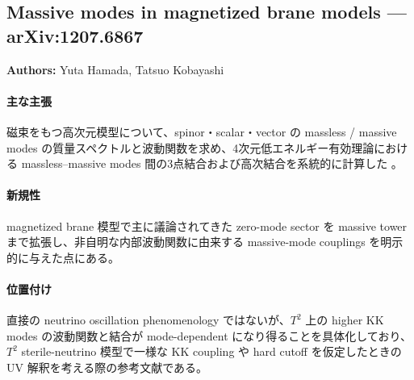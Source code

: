 \subsection{Massive modes in magnetized brane models --- arXiv:1207.6867}

\textbf{Authors:} Yuta Hamada, Tatsuo Kobayashi

\paragraph{主な主張}
磁束をもつ高次元模型について、spinor・scalar・vector の massless / massive modes の質量スペクトルと波動関数を求め、4次元低エネルギー有効理論における massless--massive modes 間の3点結合および高次結合を系統的に計算した \cite{Hamada:2012Magnetized}。

\paragraph{新規性}
magnetized brane 模型で主に議論されてきた zero-mode sector を massive tower まで拡張し、非自明な内部波動関数に由来する massive-mode couplings を明示的に与えた点にある。

\paragraph{位置付け}
直接の neutrino oscillation phenomenology ではないが、$T^2$ 上の higher KK modes の波動関数と結合が mode-dependent になり得ることを具体化しており、$T^2$ sterile-neutrino 模型で一様な KK coupling や hard cutoff を仮定したときの UV 解釈を考える際の参考文献である。

